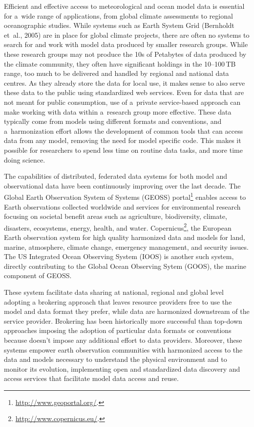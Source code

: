 \documentclass[osd, online, hvmath]{copernicus}
\begin{document}
\introduction

Efficient and effective access to meteorological and ocean model data
is essential for a~wide range of applications, from global climate
assessments   to regional oceanographic studies. 
 While systems such as Earth System Grid (Bernholdt et~al., 2005)
are in place for global climate projects, there are often no 
systems to search for and work with model data produced by
smaller research groups. While these research groups may not produce
the 10s of Petabytes of data produced by the climate community, they 
often have significant holdings in the 10--100\,TB range, too much to
be delivered and handled by regional and national data centres.  As
they already store the data for local use, it makes sense to also
serve these data to the public using standardized web services. Even
for data that are not meant for public consumption, use of a~private
service-based approach can make working with data within a~research
group more effective. These data typically come from models using
different formats and conventions, and a~harmonization effort allows
the development of common tools that can access data from any model,
removing the need for model specific code. This makes it possible for
researchers to spend less time on routine data tasks, and more time
doing science.

The capabilities of distributed, federated data systems for both model
and observational data have been continuously improving over the last
decade.  The Global Earth Observation System of Systems (GEOSS)
portal\footnote{\url{http://www.geoportal.org/}.} enables access to
Earth observations collected worldwide and services for environmental
research focusing on societal benefit areas such as agriculture,
biodiversity, climate, disasters, ecosystems, energy, health, and
water. Copernicus\footnote{\url{http://www.copernicus.eu/}.}, the
European %
Earth observation system for
high quality harmonized data and models for land, marine, atmosphere,
climate change, emergency management, and security issues. The US
Integrated Ocean Observing System (IOOS) is another such system,
directly contributing to the Global Ocean Observing Sytem (GOOS), the
marine component of GEOSS.


These system facilitate data sharing at national, regional and global level adopting a brokering approach that leaves resource providers free to use the model and data format they prefer, while data are harmonized downstream of the service provider. Brokering has been historically more successful than top-down
approaches imposing the adoption of particular data formats or 
conventions because doesn't impose any additional effort to data providers.  
Moreover, these systems empower earth observation communities with harmonized access to the data and models necessary to understand the physical environment and to monitor its evolution, implementing open and standardized data discovery and access services that facilitate model data access and reuse. 
\end{document}

